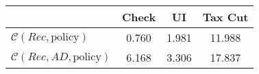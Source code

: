 \begin{tabular}{@{}lccc@{}} 
\toprule 
                          & Check      & UI    & Tax Cut    \\  \midrule 
$\mathcal{C}(Rec,\text{policy})$ & 0.760  & 1.981  & 11.988     \\ 
$\mathcal{C}(Rec, AD,\text{policy})$ & 6.168  & 3.306  & 17.837     \\ 
\end{tabular}  
